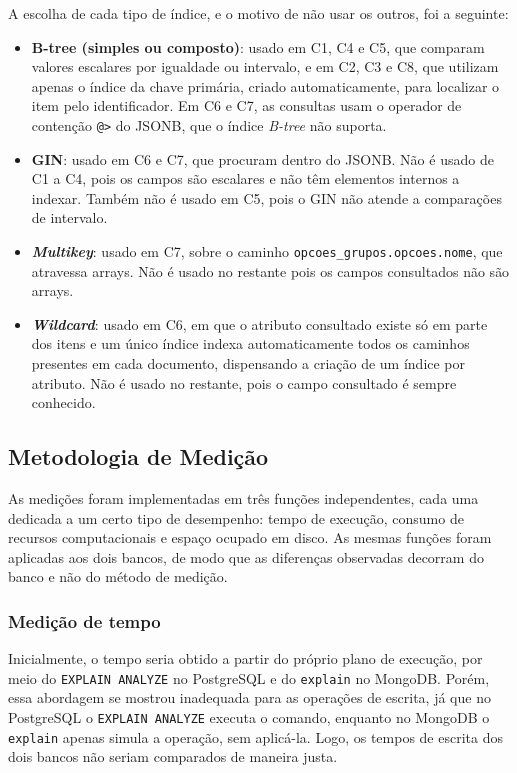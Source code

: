 A escolha de cada tipo de índice, e o motivo de não usar os outros, foi a seguinte:

\begin{itemize}
  \item \textbf{B-tree (simples ou composto)}: usado em C1, C4 e C5, que
  comparam valores escalares por igualdade ou intervalo, e em C2, C3 e C8, que utilizam
  apenas o índice da chave primária, criado automaticamente, para localizar o item pelo identificador. Em C6 e C7, as consultas usam o operador de contenção \texttt{@>} do JSONB, que o índice \textit{B-tree} não suporta.

  \item \textbf{GIN}: usado em C6 e C7, que procuram dentro do JSONB. Não é usado
  de C1 a C4, pois os campos são escalares e não têm elementos internos a
  indexar. Também não é usado em C5, pois o GIN não atende a comparações de intervalo.

  \item \textbf{\textit{Multikey}}: usado em C7, sobre o caminho
  \texttt{opcoes\_grupos.opcoes.nome}, que atravessa arrays. Não é usado no restante pois os campos consultados não são arrays.

  \item \textbf{\textit{Wildcard}}: usado em C6, em que o atributo consultado
  existe só em parte dos itens e um único índice indexa automaticamente todos os caminhos presentes em cada documento, dispensando a criação de um índice por atributo. Não é usado
  no restante, pois o campo consultado é sempre conhecido. 
\end{itemize}


\subsection{Metodologia de Medição}
\label{sec:metodologia-medicao}

As medições foram implementadas em três funções independentes, cada uma
dedicada a um certo tipo de desempenho: tempo de execução, consumo de
recursos computacionais e espaço ocupado em disco. As mesmas funções foram
aplicadas aos dois bancos, de modo que as diferenças observadas decorram do
banco e não do método de medição. 

\subsubsection{Medição de tempo}
\label{subsec:medicao-tempo}

Inicialmente, o tempo seria obtido a partir do próprio plano de execução, por
meio do \texttt{EXPLAIN ANALYZE} no PostgreSQL e do \texttt{explain} no MongoDB.
Porém, essa abordagem se mostrou inadequada para as operações de escrita, já que no
PostgreSQL o \texttt{EXPLAIN ANALYZE} executa o comando, enquanto no MongoDB o
\texttt{explain} apenas simula a operação, sem
aplicá-la. Logo, os tempos de escrita dos
dois bancos não seriam comparados de maneira justa.

